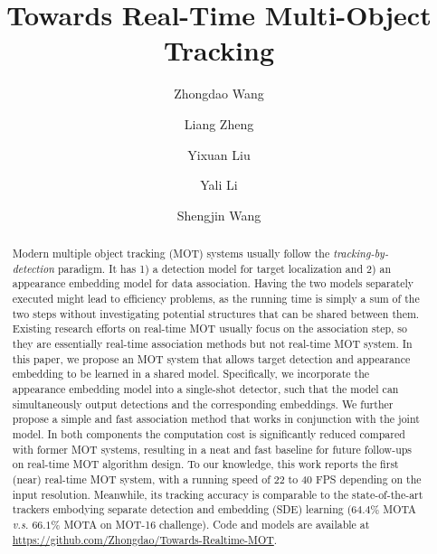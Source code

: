 \documentclass[runningheads]{llncs}
\def\vs{\textit{v.s. }}
\begin{document}
\pagestyle{headings}
\mainmatter
\def\ECCVSubNumber{100}  

\title{Towards Real-Time Multi-Object Tracking} 



\author{Zhongdao Wang \and
Liang Zheng \and
Yixuan Liu \and
Yali Li \and
Shengjin Wang }
\maketitle

\begin{abstract}
Modern multiple object tracking (MOT) systems usually follow the \emph{tracking-by-detection} paradigm. It has 1) a detection model for target localization and 2) an appearance embedding model for data association. Having the two models separately executed might lead to efficiency problems, as the running time is simply a sum of the two steps without investigating potential structures that can be shared between them. Existing research efforts on real-time MOT usually focus on the association step, so they are essentially real-time association methods but not real-time MOT system. In this paper, we propose an MOT system that allows target detection and appearance embedding to be learned in a shared model. Specifically, we incorporate the appearance embedding model into a single-shot detector, such that the model can simultaneously output detections and the corresponding embeddings.
We further propose a simple and fast association method that works in conjunction with the joint model. In both components the computation cost is significantly reduced compared with former MOT systems, resulting in a neat and fast baseline for future follow-ups on real-time MOT algorithm design.
To our knowledge, this work reports the first (near) real-time MOT system, with a running speed of 22 to 40 FPS depending on the input resolution. Meanwhile, its tracking accuracy is comparable to the state-of-the-art trackers embodying separate detection and embedding (SDE) learning ($64.4\%$ MOTA \vs $66.1\%$ MOTA on MOT-16 challenge). Code and models are available at \url{https://github.com/Zhongdao/Towards-Realtime-MOT}. 

\end{abstract}
\end{document}
